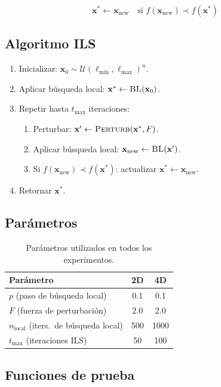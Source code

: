 \documentclass[11pt]{article}
\begin{document}
\[
\mathbf{x}^* \leftarrow \mathbf{x}_{\text{new}} \quad \text{si } f(\mathbf{x}_{\text{new}}) \prec f(\mathbf{x}^*)
\]

\subsection{Algoritmo ILS}

\begin{enumerate}
    \item Inicializar: $\mathbf{x}_0 \sim \mathcal{U}(\ell_{\min}, \ell_{\max})^n$.
    \item Aplicar b\'usqueda local: $\mathbf{x}^* \leftarrow \textsc{BL}(\mathbf{x}_0)$.
    \item Repetir hasta $t_{\max}$ iteraciones:
    \begin{enumerate}
        \item Perturbar: $\mathbf{x}' \leftarrow \textsc{Perturb}(\mathbf{x}^*, F)$.
        \item Aplicar b\'usqueda local: $\mathbf{x}_{\text{new}} \leftarrow \textsc{BL}(\mathbf{x}')$.
        \item Si $f(\mathbf{x}_{\text{new}}) \prec f(\mathbf{x}^*)$: actualizar $\mathbf{x}^* \leftarrow \mathbf{x}_{\text{new}}$.
    \end{enumerate}
    \item Retornar $\mathbf{x}^*$.
\end{enumerate}

\subsection{Par\'ametros}

\begin{table}[H]
\centering
\begin{tabular}{lcc}
\hline\hline
Par\'ametro & 2D & 4D \\
\hline
$p$ (paso de b\'usqueda local) & 0.1 & 0.1 \\
$F$ (fuerza de perturbaci\'on) & 2.0 & 2.0 \\
$n_{\text{local}}$ (iters.\ de b\'usqueda local) & 500 & 1000 \\
$t_{\max}$ (iteraciones ILS)   & 50  & 100  \\
\hline\hline
\end{tabular}
\caption{Par\'ametros utilizados en todos los experimentos.}
\end{table}

\subsection{Funciones de prueba}
\end{document}
